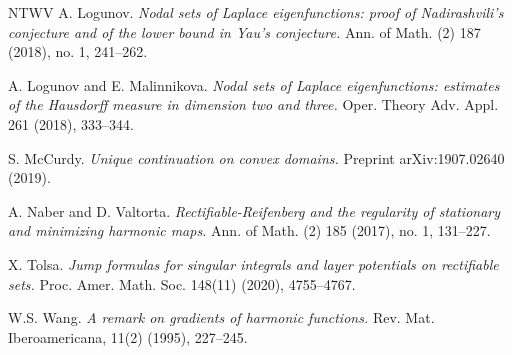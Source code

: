 \documentclass[11pt]{amsart}
\theoremstyle{definition}
\theoremstyle{remark}
\numberwithin{equation}{section}
\begin{document}
\begin{thebibliography}{NTWV}
 A. Logunov. {\em Nodal sets of Laplace eigenfunctions: proof of Nadirashvili's conjecture and of the lower bound in Yau's conjecture.} Ann. of Math. (2) 187 (2018), no. 1, 241--262. 

 A. Logunov and E. Malinnikova. {\em Nodal sets of Laplace eigenfunctions: estimates of the Hausdorff
measure in dimension two and three.} Oper. Theory Adv. Appl. 261 (2018), 333--344. 

 S. McCurdy. {\em Unique continuation on convex domains.} Preprint 
arXiv:1907.02640 (2019).

  A. Naber and D. Valtorta. {\em Rectifiable-Reifenberg and the regularity of stationary and minimizing harmonic maps.} Ann. of Math. (2) 185 (2017), no. 1, 131--227. 

 X. Tolsa. {\em Jump formulas for singular integrals and layer potentials on rectifiable sets.} Proc. Amer. Math. Soc. 148(11) (2020), 4755--4767.

 W.S. Wang. {\em A remark on gradients of harmonic functions.} Rev. Mat. Iberoamericana, 11(2) (1995), 227--245.

\end{thebibliography}
\end{document}

